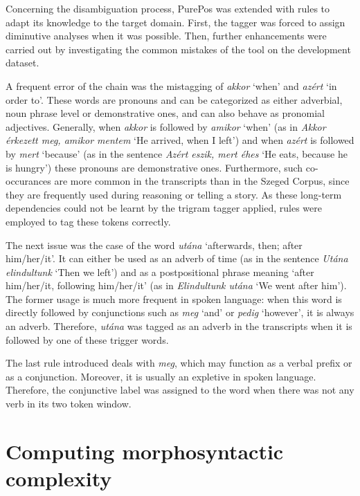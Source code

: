Concerning the disambiguation process, PurePos was extended with rules to adapt its knowledge to the target domain. 
First, the tagger was forced to assign diminutive analyses when it was possible. 
Then, further enhancements were carried out by investigating the common mistakes of the tool on the development dataset.

A frequent error of the chain was the mistagging of \textit{akkor} `when’ and \textit{azért} `in order to’. 
These words are pronouns and can be categorized as either adverbial, noun phrase level or demonstrative ones, and can also behave as pronomial adjectives. 
Generally, when \textit{akkor} is followed by \textit{amikor} `when’ (as in \textit{Akkor érkezett meg, amikor mentem} `He arrived, when I left’) and when \textit{azért} is followed by \textit{mert} `because’ (as in the sentence \textit{Azért eszik, mert éhes} `He eats, because he is hungry’) these pronouns are demonstrative ones. 
Furthermore, such co-occurances are more common in the transcripts than in the Szeged Corpus, since they are frequently used during reasoning or telling a story. 
As these long-term dependencies could not be learnt by the trigram tagger applied, rules were employed to tag these tokens correctly.

The next issue was the case of the word \textit{utána} `afterwards, then; after him/her/it’. 
It can either be used as an adverb of time (as in the sentence \textit{Utána elindultunk} `Then we left’) and as a postpositional phrase meaning `after him/her/it, following him/her/it’ (as in \textit{Elindultunk utána} `We went after him’). 
The former usage is much more frequent in spoken language: when this word is directly followed by conjunctions such as \textit{meg} `and’ or \textit{pedig} `however’, it is always an adverb. 
Therefore, \textit{utána} was tagged as an adverb in the transcripts when it is followed by one of these trigger words. 

The last rule introduced deals with \textit{meg}, which may function as a verbal prefix or as a conjunction.  
Moreover, it is usually an expletive in spoken language.
Therefore, the conjunctive label was assigned to the word when there was not any verb in its two token window.

\section{Computing morphosyntactic complexity}

